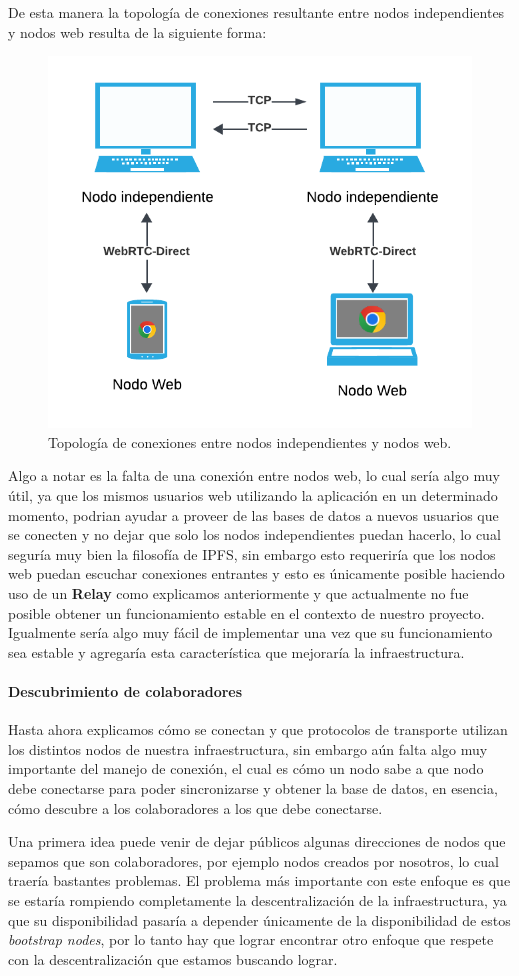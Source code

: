 De esta manera la topología de conexiones resultante entre nodos independientes y nodos web resulta de la siguiente forma: 

\begin{figure}[H]
    \centering
    \includegraphics[width=0.5\linewidth]{img/solucion-ipfs/topologia.png}
    \caption{Topología de conexiones entre nodos independientes y nodos web.}
    \label{fig:bdd-articulos}
\end{figure}

Algo a notar es la falta de una conexión entre nodos web, lo cual sería algo muy útil, ya que los mismos usuarios web utilizando la aplicación en un determinado momento, podrian ayudar a proveer de las bases de datos a nuevos usuarios que se conecten y no dejar que solo los nodos independientes puedan hacerlo, lo cual seguría muy bien la filosofía de IPFS, sin embargo esto requeriría que los nodos web puedan escuchar conexiones entrantes y esto es únicamente posible haciendo uso de un \textbf{Relay} como explicamos anteriormente y que actualmente no fue posible obtener un funcionamiento estable en el contexto de nuestro proyecto. Igualmente sería algo muy fácil de implementar una vez que su funcionamiento sea estable y agregaría esta característica que mejoraría la infraestructura.

\paragraph{Descubrimiento de colaboradores}

Hasta ahora explicamos cómo se conectan y que protocolos de transporte utilizan los distintos nodos de nuestra infraestructura, sin embargo aún falta algo muy importante del manejo de conexión, el cual es cómo un nodo sabe a que nodo debe conectarse para poder sincronizarse y obtener la base de datos, en esencia, cómo descubre a los colaboradores a los que debe conectarse.

Una primera idea puede venir de dejar públicos algunas direcciones de nodos que sepamos que son colaboradores, por ejemplo nodos creados por nosotros, lo cual traería bastantes problemas. El problema más importante con este enfoque es que se estaría rompiendo completamente la descentralización de la infraestructura, ya que su disponibilidad pasaría a depender únicamente de la disponibilidad de estos \textit{bootstrap nodes}, por lo tanto hay que lograr encontrar otro enfoque que respete con la descentralización que estamos buscando lograr.

